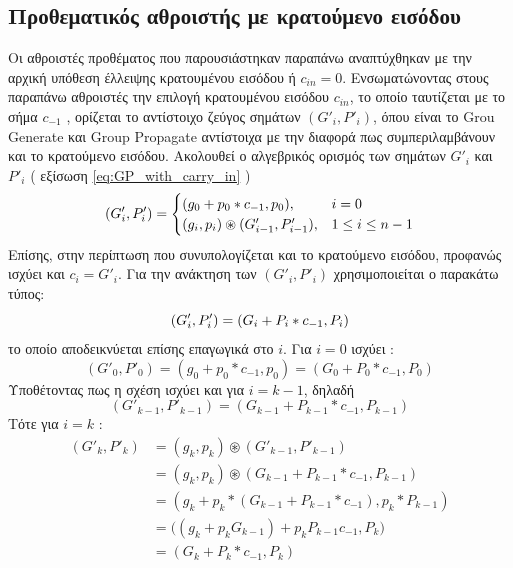 \subsection{Προθεματικός αθροιστής με κρατούμενο εισόδου}
Οι αθροιστές προθέματος που παρουσιάστηκαν παραπάνω αναπτύχθηκαν με την αρχική
υπόθεση έλλειψης κρατουμένου εισόδου ή $c_{in} = 0$. Ενσωματώνοντας στους παραπάνω 
αθροιστές την επιλογή κρατουμένου εισόδου $c_{in}$, το οποίο ταυτίζεται με το σήμα $c_{-1}$
, ορίζεται το αντίστοιχο ζεύγος σημάτων $(G'_i,P'_i)$, όπου είναι το Grou Generate και 
Group Propagate αντίστοιχα με την διαφορά πως συμπεριλαμβάνουν και το κρατούμενο εισόδου.
Ακολουθεί ο αλγεβρικός ορισμός των σημάτων $G'_i$ και $P'_i$ ( εξίσωση \ref{eq:GP_with_carry_in} )
\begin{equation}
    \equationame{Αλγεβρικός ορισμός των $(G'_i,P'_i)$}
    \label{eq:GP_with_carry_in}
    (G'_i,P'_i) = 
    \begin{cases}
        (g_0 + p_0*c_{-1} , p_0)   , & i = 0\\
        (g_i,p_i)\circledast (G'_{i-1},P'_{i-1}) , & 1 \leq i \leq n-1
    \end{cases}
\end{equation}
Επίσης, στην περίπτωση που συνυπολογίζεται και το κρατούμενο εισόδου, προφανώς ισχύει και 
$c_i = G'_i$. Για την ανάκτηση των $(G'_i,P'_i)$ χρησιμοποιείται ο παρακάτω τύπος:
\begin{equation}
    \label{eq:G'P'_From_GP}
    \equationame{Ανάκτηση των $(G'_i,P'_i)$ από $(G_i,P_i)$}
    (G'_i,P'_i) = (G_i + P_i*c_{-1} , P_i)
\end{equation}
το οποίο αποδεικνύεται επίσης επαγωγικά στο $i$. Για $i=0$ ισχύει :
\begin{equation*}
    (G'_0,P'_0) = (g_0 + p_0*c_{-1} , p_0) =  (G_0 + P_0*c_{-1} , P_0)
\end{equation*}
Υποθέτοντας πως η σχέση ισχύει και για $i=k-1$, δηλαδή
\begin{equation*}
    (G'_{k-1},P'_{k-1}) = (G_{k-1} + P_{k-1}*c_{-1} , P_{k-1})
\end{equation*}
Τότε για $i=k$ :
\begin{equation*}
    \begin{split}
        (G'_k,P'_k) &= (g_k,p_k) \circledast (G'_{k-1},P'_{k-1})\\
                    &= (g_k,p_k) \circledast (G_{k-1} + P_{k-1}*c_{-1} , P_{k-1}) \\
                    &= ( g_k + p_k*(G_{k-1} + P_{k-1}*c_{-1}) , p_k*P_{k-1} ) \\
                    &= \big( (g_k + p_kG_{k-1}) + p_kP_{k-1}c_{-1} , P_k  \big) \\
                    &= ( G_k + P_k*c_{-1} , P_k )
    \end{split}
\end{equation*}

